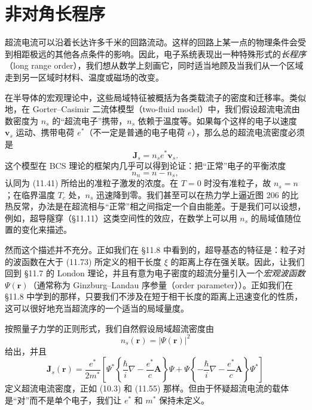 \section{非对角长程序}

超流电流可以沿着长达许多千米的回路流动。这样的回路上某一点的物理条件会受到相距极远的其他各点条件的影响。因此，电子系统表现出一种特殊形式的\emph{长程序}（long range order），我们想从数学上刻画它，同时适当地顾及当我们从一个区域走到另一区域时材料、温度或磁场的改变。

在半导体的宏观理论中，这些局域特征被概括为各类载流子的密度和迁移率。类似地，在 Gorter--Casimir 二流体模型（two-fluid model）中，我们假设超流电流由数密度为 $n_s$ 的“超流电子”携带，$n_s$ 依赖于温度等。如果每个这样的电子以速度 $\mathbf{v}_s$ 运动、携带电荷 $e^{*}$（不一定是普通的电子电荷 $e$），那么总的超流电流密度必须是
\begin{equation*}
\mathbf{J}_s = n_s e^{*}\mathbf{v}_s. \tag{11.77}
\end{equation*}
这个模型在 BCS 理论的框架内几乎可以得到论证：把“正常”电子的平衡浓度
\begin{equation*}
n_n = n - n_s, \tag{11.78}
\end{equation*}
认同为 (11.41) 所给出的准粒子激发的浓度。在 $T=0$ 时没有准粒子，故 $n_s=n$；在临界温度 $T_c$ 处，$n_s$ 迅速降到零。我们甚至可以在热力学上逼近图 206 的比热反常，办法是在超流相与“正常”相之间指定一个自由能差。于是我们可以设想，例如，超导隧穿（§11.11）这类空间性的效应，在数学上可以用 $n_s$ 的局域值随位置的变化来描述。

然而这个描述并不充分。正如我们在 §11.8 中看到的，超导基态的特征是：粒子对的波函数在大于 (11.73) 所定义的相干长度 $\xi$ 的距离上存在强关联。因此，让我们回到 §11.7 的 London 理论，并且有意为电子密度的超流分量引入一个\emph{宏观波函数} $\Psi(\mathbf{r})$（通常称为 Ginzburg--Landau 序参量（order parameter））。正如我们在 §11.8 中学到的那样，只要我们不涉及在短于相干长度的距离上迅速变化的性质，这可以很好地充当超流序的一个适当的局域量度。

按照量子力学的正则形式，我们自然假设局域超流密度由
\begin{equation*}
n_s(\mathbf{r}) = |\Psi(\mathbf{r})|^{2} \tag{11.79}
\end{equation*}
给出，并且
\begin{equation*}
\mathbf{J}_s(\mathbf{r}) = \frac{e^{*}}{2m^{*}}\left[\Psi^{*}\left\{\frac{\hbar}{i}\nabla - \frac{e^{*}}{c}\mathbf{A}\right\}\Psi + \Psi\left\{-\frac{\hbar}{i}\nabla - \frac{e^{*}}{c}\mathbf{A}\right\}\Psi^{*}\right] \tag{11.80}
\end{equation*}
定义超流电流密度，正如 (10.3) 和 (11.55) 那样。但由于怀疑超流电流的载体是“对”而不是单个电子，我们让 $e^{*}$ 和 $m^{*}$ 保持未定义。

